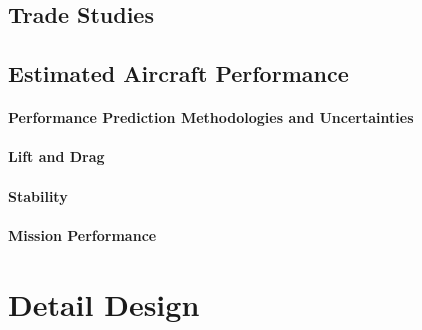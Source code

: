 \documentclass[report]{byu-aero}
\begin{document}
\subsection{Trade Studies}
\label{ssec:tradestudies}




\subsection{Estimated Aircraft Performance}
\label{ssec:estaircraftperfomance}




\paragraph{Performance Prediction Methodologies and Uncertainties}
\label{sssec:uncertaintyanalysis}




\paragraph{Lift and Drag}
\label{sssec:liftdrag}




\paragraph{Stability}
\label{sssec:stability}



\paragraph{Mission Performance}
\label{sssec:missionperformance}





\section{Detail Design} %
\label{sec:detaildesign}
\end{document}
